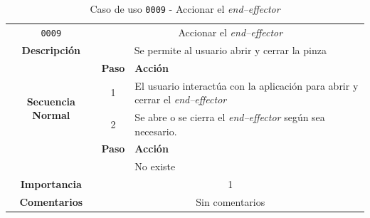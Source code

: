 \begin{table}[H]
    \centering
    \begin{tabularx}{\textwidth}{|c|c|X|}
        \cline{1-3}
        \texttt{0009}        & \multicolumn{2}{c|}{Accionar el \textit{end--effector}}                                      
        \\ \cline{1-3}
        \textbf{Descripción} & \multicolumn{2}{m{13cm}|}{Se permite al usuario abrir y cerrar la pinza}
        \\ \cline{1-3}
        \multirow{4}{*}{\textbf{Secuencia Normal}} & \textbf{Paso} & \textbf{Acción}
        \\ \cline{2-3}                    &   1  & El usuario interactúa con la aplicación para abrir y cerrar el \textit{end--effector}
        \\ \cline{2-3}                    &   2  & Se abre o se cierra el \textit{end--effector} según sea necesario. 
        \\ \cline{1-3}
        \multirow{2}{*}{\textbf{Excepciones}} & \textbf{Paso} & \textbf{Acción}
        \\ \cline{2-3}                    &      &  No existe
        \\ \cline{1-3}
        \textbf{Importancia}                 & \multicolumn{2}{c|}{1}           
        \\ \cline{1-3}
        \textbf{Comentarios}                 & \multicolumn{2}{c|}{Sin comentarios}
        \\ \cline{1-3}
    \end{tabularx}
    \caption{Caso de uso \texttt{0009} - Accionar el \textit{end--effector}}
\end{table}